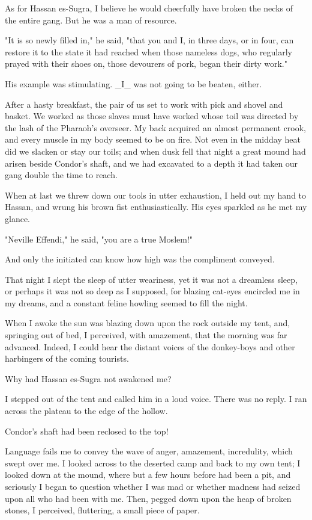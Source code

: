 As for Hassan es-Sugra, I believe he would cheerfully have broken the
necks of the entire gang. But he was a man of resource.

"It is so newly filled in," he said, "that you and I, in three days,
or in four, can restore it to the state it had reached when those
nameless dogs, who regularly prayed with their shoes on, those
devourers of pork, began their dirty work."

His example was stimulating. _I_ was not going to be beaten, either.

After a hasty breakfast, the pair of us set to work with pick and
shovel and basket. We worked as those slaves must have worked whose
toil was directed by the lash of the Pharaoh's overseer. My back
acquired an almost permanent crook, and every muscle in my body seemed
to be on fire. Not even in the midday heat did we slacken or stay our
toils; and when dusk fell that night a great mound had arisen beside
Condor's shaft, and we had excavated to a depth it had taken our gang
double the time to reach.

When at last we threw down our tools in utter exhaustion, I held out
my hand to Hassan, and wrung his brown fist enthusiastically. His eyes
sparkled as he met my glance.

"Neville Effendi," he said, "you are a true Moslem!"

And only the initiated can know how high was the compliment conveyed.

That night I slept the sleep of utter weariness, yet it was not a
dreamless sleep, or perhaps it was not so deep as I supposed, for
blazing cat-eyes encircled me in my dreams, and a constant feline
howling seemed to fill the night.

When I awoke the sun was blazing down upon the rock outside my tent,
and, springing out of bed, I perceived, with amazement, that the
morning was far advanced. Indeed, I could hear the distant voices of
the donkey-boys and other harbingers of the coming tourists.

Why had Hassan es-Sugra not awakened me?

I stepped out of the tent and called him in a loud voice. There was
no reply. I ran across the plateau to the edge of the hollow.

Condor's shaft had been reclosed to the top!

Language fails me to convey the wave of anger, amazement, incredulity,
which swept over me. I looked across to the deserted camp and back to
my own tent; I looked down at the mound, where but a few hours before
had been a pit, and seriously I began to question whether I was mad or
whether madness had seized upon all who had been with me. Then, pegged
down upon the heap of broken stones, I perceived, fluttering, a small
piece of paper.

